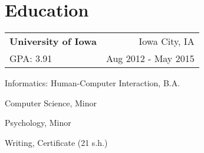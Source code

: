 \documentclass[letterpaper,11pt]{article}
\makeatletter
\newcommand{\org}[4]{
  \begin{tabular*}{\textwidth}{@{\extracolsep{\fill}} l r}
    \bfseries{#1} & #2 \\
    \small #3 & \small #4 \\
  \end{tabular*}
}
\newcommand{\items}{\begin{itemize}[leftmargin=*]}
\newcommand{\itemsEnd}{\end{itemize}}
\makeatother
\begin{document}
\section{Education}
  \org
    {University of Iowa}{Iowa City, IA}
    {GPA: 3.91}{Aug 2012 - May 2015}
    \items
      \begin{minipage}[t]{0.6\linewidth}
        \vspace{-2pt}
        \item Informatics: Human-Computer Interaction, B.A.
        \vspace{-2pt}
        \item Computer Science, Minor
      \end{minipage}
      \hspace{0.04\linewidth}
      \begin{minipage}[t]{0.35\linewidth}
        \vspace{-2pt}
        \item Psychology, Minor
        \vspace{-2pt}
        \item Writing, Certificate (21 s.h.)
      \end{minipage}
    \itemsEnd
\end{document}
